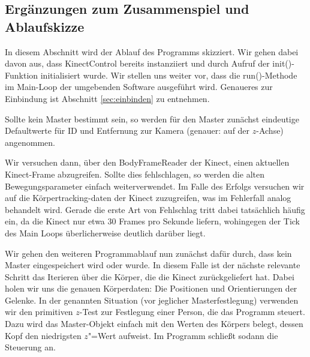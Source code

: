 \subsection{Ergänzungen zum Zusammenspiel und Ablaufskizze}
In diesem Abschnitt wird der Ablauf des Programms skizziert. Wir gehen dabei davon aus, dass KinectControl bereits instanziiert und durch Aufruf der init()-Funktion initialisiert wurde. Wir stellen uns weiter vor, dass die run()-Methode im Main-Loop der umgebenden Software ausgeführt wird. Genaueres zur Einbindung ist Abschnitt \ref{sec:einbinden} zu entnehmen.\par 
Sollte kein Master bestimmt sein, so werden für den Master zunächst eindeutige Defaultwerte für ID und Entfernung zur Kamera (genauer: auf der $z$-Achse) angenommen.\par 
Wir versuchen dann, über den BodyFrameReader der Kinect, einen aktuellen Kinect-Frame abzugreifen. Sollte dies fehlschlagen, so werden die alten Bewegungsparameter einfach weiterverwendet. Im Falle des Erfolgs versuchen wir auf die Körpertracking-daten der Kinect zuzugreifen, was im Fehlerfall analog behandelt wird. Gerade die erste Art von Fehlschlag tritt dabei tatsächlich häufig ein, da die Kinect nur etwa 30 Frames pro Sekunde liefern, wohingegen der Tick des Main Loops überlicherweise deutlich darüber liegt.\par 
Wir gehen den weiteren Programmablauf nun zunächst dafür durch, dass kein Master eingespeichert wird oder wurde. In diesem Falle ist der nächste relevante Schritt das Iterieren über die Körper, die die Kinect zurückgeliefert hat. Dabei holen wir uns die genauen Körperdaten: Die Positionen und Orientierungen der Gelenke. In der genannten Situation (vor jeglicher Masterfestlegung) verwenden wir den primitiven $z$-Test zur Festlegung einer Person, die das Programm steuert. Dazu wird das Master-Objekt einfach mit den Werten des Körpers belegt, dessen Kopf den niedrigsten $z$"=Wert aufweist. Im Programm schließt sodann die Steuerung an.\par 
